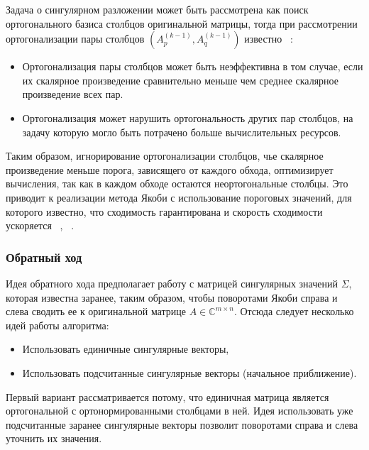 Задача о сингулярном разложении может быть рассмотрена как поиск ортогонального базиса столбцов оригинальной матрицы, тогда при рассмотрении ортогонализации пары столбцов $(A^{(k-1)}_p, A^{(k-1)}_q)$ известно ~\cite{deRijk1989}:
\begin{itemize}
    \item Ортогонализация пары столбцов может быть неэффективна в том случае, если их скалярное произведение сравнительно меньше чем среднее скалярное произведение всех пар.
    \item Ортогонализация может нарушить ортогональность других пар столбцов, на задачу которую могло быть потрачено больше вычислительных ресурсов. 
\end{itemize}
Таким образом, игнорирование ортогонализации столбцов, чье скалярное произведение меньше порога, зависящего от каждого обхода,  оптимизирует вычисления, так как в каждом обходе остаются неортогональные столбцы. Это приводит к реализации метода Якоби с использование пороговых значений, для которого известно, что сходимость гарантирована и скорость сходимости ускоряется ~\cite{Dongarra2018}, ~\cite{Forsythe1960}. 

\subsubsection{Обратный ход}

Идея обратного хода предполагает работу с матрицей сингулярных значений $\Sigma$, которая известна заранее, таким образом, чтобы поворотами Якоби справа и слева сводить ее к оригинальной матрице $A \in \mathbb{C}^{m\times n}$. Отсюда следует несколько идей работы алгоритма: 
\begin{itemize}
    \item Использовать единичные сингулярные векторы,
    \item Использовать подсчитанные сингулярные векторы (начальное приближение).
\end{itemize}
Первый вариант рассматривается потому, что единичная матрица является ортогональной с ортонормированными столбцами в ней. 
Идея использовать уже подсчитанные заранее сингулярные векторы позволит поворотами справа и слева уточнить их значения. 

